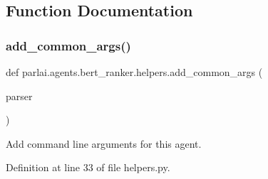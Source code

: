 \subsection{Function Documentation}
\mbox{\label{namespaceparlai_1_1agents_1_1bert__ranker_1_1helpers_ac2e926c3aba3a62be09e2c37dffcaee2}} 
\subsubsection{\texorpdfstring{add\+\_\+common\+\_\+args()}{add\_common\_args()}}
{\footnotesize\ttfamily def parlai.\+agents.\+bert\+\_\+ranker.\+helpers.\+add\+\_\+common\+\_\+args (\begin{DoxyParamCaption}\item[{}]{parser }\end{DoxyParamCaption})}

\begin{DoxyVerb}Add command line arguments for this agent.
\end{DoxyVerb}
 

Definition at line 33 of file helpers.\+py.


